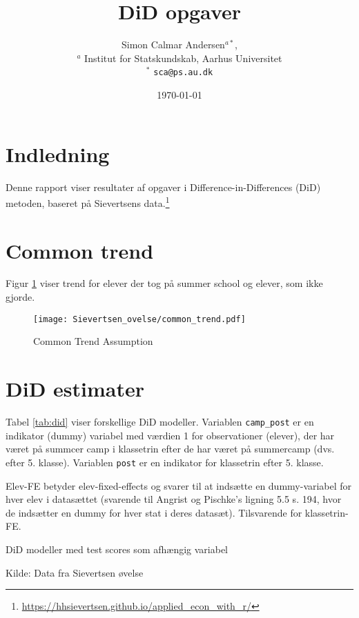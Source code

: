 \documentclass[12pt]{article}
\title{DiD opgaver }
\author{Simon Calmar Andersen$^{a*}$,  \\
        \small $^{a}$ Institut for Statskundskab, Aarhus Universitet \\
        \small $^{*}$ \tt{sca@ps.au.dk}}
\date{\today} %
\begin{document}
\doublespacing

\maketitle




\section*{Indledning}
Denne rapport viser resultater af opgaver i Difference-in-Differences (DiD) metoden, baseret på Sievertsens data.\footnote{\url{https://hhsievertsen.github.io/applied_econ_with_r/}}


\clearpage

\section*{Common trend}




Figur \ref{common_trend} viser trend for elever der tog på summer school og elever, som ikke gjorde.


\begin{figure}
\caption{Common Trend Assumption} \label{common_trend}
\texttt{[image: Sievertsen\_ovelse/common\_trend.pdf]}
\end{figure}

\section*{DiD estimater}
Tabel \ref{tab:did} viser forskellige DiD modeller. Variablen \verb|camp_post| er en indikator (dummy) variabel med værdien 1 for observationer (elever), der har været på summcer camp i klassetrin efter de har været på summercamp (dvs. efter 5. klasse). Variablen \verb|post| er en indikator for klassetrin efter 5. klasse.

Elev-FE betyder elev-fixed-effects og svarer til at indsætte en dummy-variabel for hver elev i datasættet (svarende til Angrist og Pischke's ligning 5.5 s. 194, hvor de indsætter en dummy for hver stat i deres datasæt). Tilsvarende for klassetrin-FE.

\begin{table}[h] \centering
		\caption{DiD modeller med test scores som afhængig variabel} \label{tab:did}
	\begin{adjustbox}{max width=\textwidth}
	\begin{threeparttable} 
			
		\begin{tablenotes}
            \item Kilde: Data fra Sievertsen øvelse
        \end{tablenotes}
	\end{threeparttable}
	\end{adjustbox}
\end{table}
\end{document}
